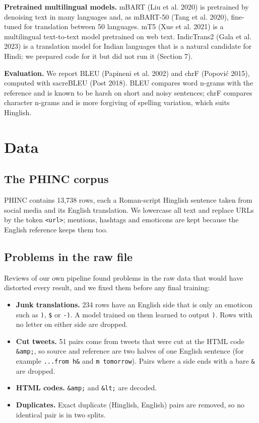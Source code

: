\documentclass[11pt,a4paper]{article}
\begin{document}
\textbf{Pretrained multilingual models.} mBART (Liu et al. 2020) is pretrained by denoising text in many languages and, as mBART-50 (Tang et al. 2020), fine-tuned for translation between 50 languages. mT5 (Xue et al. 2021) is a multilingual text-to-text model pretrained on web text. IndicTrans2 (Gala et al. 2023) is a translation model for Indian languages that is a natural candidate for Hindi; we prepared code for it but did not run it (Section 7).

\textbf{Evaluation.} We report BLEU (Papineni et al. 2002) and chrF (Popovi\'c 2015), computed with sacreBLEU (Post 2018). BLEU compares word n-grams with the reference and is known to be harsh on short and noisy sentences; chrF compares character n-grams and is more forgiving of spelling variation, which suits Hinglish.

\section{Data}
\subsection{The PHINC corpus}
PHINC contains 13,738 rows, each a Roman-script Hinglish sentence taken from social media and its English translation. We lowercase all text and replace URLs by the token \texttt{\textless{}url\textgreater{}}; mentions, hashtags and emoticons are kept because the English reference keeps them too.

\subsection{Problems in the raw file}
Reviews of our own pipeline found problems in the raw data that would have distorted every result, and we fixed them before any final training:

\begin{itemize}\setlength\itemsep{0pt}
\item \textbf{Junk translations.} 234 rows have an English side that is only an emoticon such as \texttt{)}, \texttt{\$} or \texttt{-)}. A model trained on them learned to output \texttt{)}. Rows with no letter on either side are dropped.
\item \textbf{Cut tweets.} 51 pairs come from tweets that were cut at the HTML code \texttt{\&amp;}, so source and reference are two halves of one English sentence (for example \texttt{...from h\&} and \texttt{m tomorrow}). Pairs where a side ends with a bare \texttt{\&} are dropped.
\item \textbf{HTML codes.} \texttt{\&amp;} and \texttt{\&lt;} are decoded.
\item \textbf{Duplicates.} Exact duplicate (Hinglish, English) pairs are removed, so no identical pair is in two splits.
\end{itemize}
\end{document}
